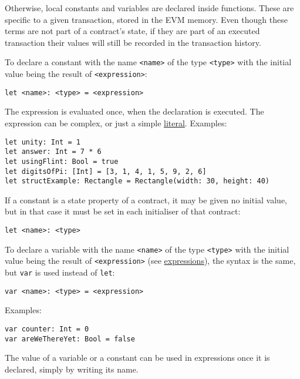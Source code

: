 Otherwise, local constants and variables are declared inside functions. These are specific to a given transaction, stored in the EVM memory. Even though these terms are not part of a contract's state, if they are part of an executed transaction their values will still be recorded in the transaction history.

To declare a constant with the name \texttt{<name>} of the type \texttt{<type>} with the initial value being the result of \texttt{<expression>}:

\begin{verbatim}
let <name>: <type> = <expression>
\end{verbatim}

The expression is evaluated once, when the declaration is executed. The expression can be complex, or just a simple \hyperref[sec:appendix-b-literals]{literal}. Examples:

\begin{verbatim}
let unity: Int = 1
let answer: Int = 7 * 6
let usingFlint: Bool = true
let digitsOfPi: [Int] = [3, 1, 4, 1, 5, 9, 2, 6]
let structExample: Rectangle = Rectangle(width: 30, height: 40)
\end{verbatim}

If a constant is a state property of a contract, it may be given no initial value, but in that case it must be set in each initialiser of that contract:

\begin{verbatim}
let <name>: <type>
\end{verbatim}

To declare a variable with the name \texttt{<name>} of the type \texttt{<type>} with the initial value being the result of \texttt{<expression>} (see \hyperref[sec:appendix-b-expressions]{expressions}), the syntax is the same, but \texttt{var} is used instead of \texttt{let}:

\begin{verbatim}
var <name>: <type> = <expression>
\end{verbatim}

Examples:

\begin{verbatim}
var counter: Int = 0
var areWeThereYet: Bool = false
\end{verbatim}

The value of a variable or a constant can be used in expressions once it is declared, simply by writing its name.

